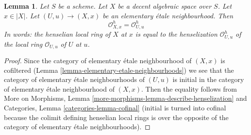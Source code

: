\documentclass{stacks-project}
\theoremstyle{plain}
\newtheorem{lemma}[subsection]{Lemma}
\theoremstyle{definition}
\theoremstyle{remark}
\numberwithin{equation}{subsection}
\begin{document}
\begin{lemma}
\label{lemma-describe-henselian-local-ring}
Let $S$ be a scheme. Let $X$ be a decent algebraic space over $S$.
Let $x \in |X|$. Let $(U, u) \to (X, x)$ be an elementary
\'etale neighbourhood. Then
$$
\mathcal{O}_{X, x}^h = \mathcal{O}_{U, u}^h
$$
In words: the henselian local ring of $X$ at $x$
is equal to the henselization $\mathcal{O}_{U, u}^h$
of the local ring $\mathcal{O}_{U, u}$ of $U$ at $u$.
\end{lemma}

\begin{proof}
Since the category of elementary \'etale neighbourhood of $(X, x)$
is cofiltered (Lemma \ref{lemma-elementary-etale-neighbourhoods})
we see that
the category of elementary \'etale neighbourhoods of $(U, u)$
is initial in
the category of elementary \'etale neighbourhood of $(X, x)$.
Then the equality follows from
More on Morphisms, Lemma \ref{more-morphisms-lemma-describe-henselization}
and
Categories, Lemma \ref{categories-lemma-cofinal}
(initial is turned into cofinal because the colimit
defining henselian local rings is over the
opposite of the category of elementary
\'etale neighbourhoods).
\end{proof}
\end{document}
